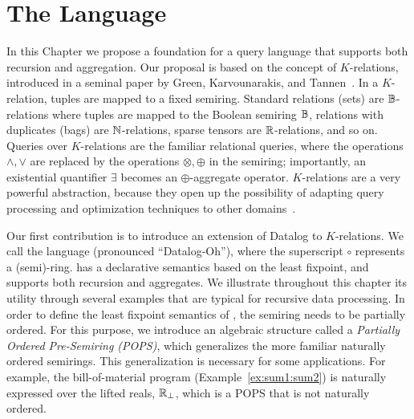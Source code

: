 \chapter{The \datalogo Language}
\label{chap:datalogo}

In this Chapter we propose a foundation for a query language that
supports both recursion and aggregation.  Our proposal is based on the
concept of $K$-relations, introduced in a seminal
paper by Green, Karvounarakis, and Tannen~\cite{DBLP:conf/pods/GreenKT07}.
In a $K$-relation, tuples are
mapped to a fixed semiring. Standard relations (sets) are
$\mathbb B$-relations where tuples are mapped to the Boolean semiring $\mathbb B$,
relations with duplicates (bags) are $\mathbb N$-relations, sparse tensors
are $\mathbb R$-relations, and so on.  Queries over $K$-relations are the
familiar relational queries, where the operations $\wedge, \vee$ are
replaced by the operations $\otimes, \oplus$ in the semiring;
importantly, an existential quantifier $\exists$ becomes an
$\oplus$-aggregate operator.
$K$-relations are a very powerful abstraction, because they open up
the possibility of adapting query processing and optimization
techniques to other domains~\cite{DBLP:conf/pods/KhamisNR16}.

Our first contribution is to introduce an extension of Datalog to
$K$-relations.  We call the language \datalogo 
 (pronounced ``Datalog-Oh''),
 where the superscript
$\circ$ represents a (semi)-ring. \datalogo has a declarative semantics
based on the least fixpoint, and supports both recursion and
aggregates.  We illustrate throughout this chapter its utility through
several examples that are typical for recursive data processing.  In
order to define the least fixpoint semantics of \datalogo, the semiring
needs to be partially ordered.  For this purpose, we introduce an
algebraic structure called a {\em Partially Ordered Pre-Semiring (POPS)\/},
which generalizes the more familiar naturally ordered semirings.  This
generalization is necessary for some applications.  For example, the
bill-of-material program (Example~\ref{ex:sum1:sum2}) is naturally
expressed over the lifted reals, $\mathbb R_\bot$, which is a POPS that is
not naturally ordered.


